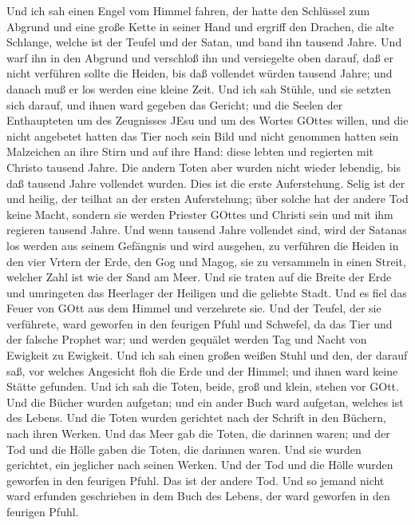  Und ich sah einen Engel vom Himmel fahren, der hatte den
Schlüssel zum Abgrund und eine große Kette in seiner Hand 
und ergriff den Drachen, die alte Schlange, welche ist der Teufel und
der Satan, und band ihn tausend Jahre.  Und warf ihn in den
Abgrund und verschloß ihn und versiegelte oben darauf, daß er nicht
verführen sollte die Heiden, bis daß vollendet würden tausend Jahre; und
danach muß er los werden eine kleine Zeit.  Und ich sah
Stühle, und sie setzten sich darauf, und ihnen ward gegeben das Gericht;
und die Seelen der Enthaupteten um des Zeugnisses JEsu und um des Wortes
GOttes willen, und die nicht angebetet hatten das Tier noch sein Bild
und nicht genommen hatten sein Malzeichen an ihre Stirn und auf ihre
Hand: diese lebten und regierten mit Christo tausend Jahre. 
Die andern Toten aber wurden nicht wieder lebendig, bis daß tausend
Jahre vollendet wurden. Dies ist die erste Auferstehung. 
Selig ist der und heilig, der teilhat an der ersten Auferstehung; über
solche hat der andere Tod keine Macht, sondern sie werden Priester
GOttes und Christi sein und mit ihm regieren tausend Jahre. 
Und wenn tausend Jahre vollendet sind, wird der Satanas los werden aus
seinem Gefängnis  und wird ausgehen, zu verführen die Heiden
in den vier Vrtern der Erde, den Gog und Magog, sie zu versammeln in
einen Streit, welcher Zahl ist wie der Sand am Meer.  Und
sie traten auf die Breite der Erde und umringeten das Heerlager der
Heiligen und die geliebte Stadt. Und es fiel das Feuer von GOtt aus dem
Himmel und verzehrete sie.  Und der Teufel, der sie
verführete, ward geworfen in den feurigen Pfuhl und Schwefel, da das
Tier und der falsche Prophet war; und werden gequälet werden Tag und
Nacht von Ewigkeit zu Ewigkeit.  Und ich sah einen großen
weißen Stuhl und den, der darauf saß, vor welches Angesicht floh die
Erde und der Himmel; und ihnen ward keine Stätte gefunden. 
Und ich sah die Toten, beide, groß und klein, stehen vor GOtt. Und die
Bücher wurden aufgetan; und ein ander Buch ward aufgetan, welches ist
des Lebens. Und die Toten wurden gerichtet nach der Schrift in den
Büchern, nach ihren Werken.  Und das Meer gab die Toten,
die darinnen waren; und der Tod und die Hölle gaben die Toten, die
darinnen waren. Und sie wurden gerichtet, ein jeglicher nach seinen
Werken.  Und der Tod und die Hölle wurden geworfen in den
feurigen Pfuhl. Das ist der andere Tod.  Und so jemand
nicht ward erfunden geschrieben in dem Buch des Lebens, der ward
geworfen in den feurigen Pfuhl.

